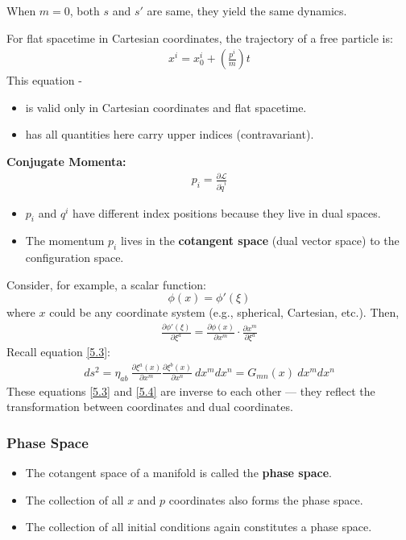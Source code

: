 \documentclass[14pt]{article} %
\begin{document}
When $m = 0$, both $s$ and $s'$ are same, they yield the same dynamics.
\begin{tcolorbox}[ title=\textbf{Note:}]
For flat spacetime in Cartesian coordinates, the trajectory of a free particle is:
\begin{align*}
x^i = x^i_0 + \left( \frac{p^i}{m} \right)t
\end{align*}
This equation -
\begin{itemize}
    \item is valid only in Cartesian coordinates and flat spacetime.
    \item has all quantities here carry upper indices (contravariant).
\end{itemize}

\vspace{1em}
\noindent
\textbf{Conjugate Momenta:}
\begin{align*}
p_i = \frac{\partial \mathcal{L}}{\partial \dot{q}^i}
\end{align*}

\begin{itemize}
    \item $p_i$ and $q^i$ have different index positions because they live in dual spaces.
    \item The momentum $p_i$ lives in the \textbf{cotangent space} (dual vector space) to the configuration space.
\end{itemize}
\end{tcolorbox}
Consider, for example, a scalar function: 
$$\phi(x) = \phi'(\xi)$$
where $x$ could be any coordinate system (e.g., spherical, Cartesian, etc.). Then,
\begin{align*}
    \frac{\partial \phi'(\xi)}{\partial \xi^a} 
    = \frac{\partial \phi(x)}{\partial x^m} \cdot \frac{\partial x^m}{\partial \xi^a} \tag{5.4} \label{5.4}
\end{align*}
Recall equation \eqref{5.3}:
\begin{align*}
    ds^2 = \eta_{ab}~ \frac{\partial \xi^a(x)}{\partial x^m} \frac{\partial \xi^b(x)}{\partial x^n}~ dx^m dx^n = G_{mn}(x)~ dx^m dx^n
\end{align*}
These equations \eqref{5.3} and \eqref{5.4} are inverse to each other — they reflect the transformation between coordinates and dual coordinates.
\begin{tcolorbox}[ title=\textbf{Note:}]
\subsubsection*{Phase Space}
\begin{itemize}
    \item The cotangent space of a manifold is called the \textbf{phase space}.
    \item The collection of all $x$ and $p$ coordinates also forms the phase space.
    \item The collection of all initial conditions again constitutes a phase space.
\end{itemize}
\end{tcolorbox}
\end{document}
